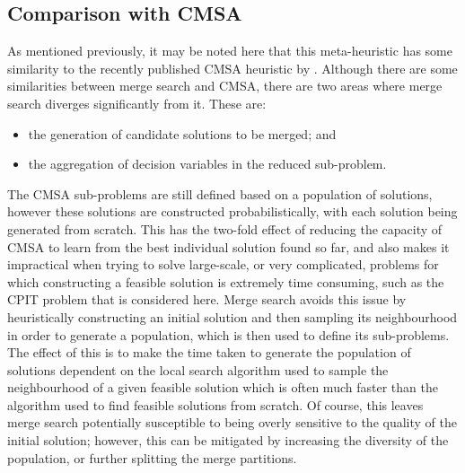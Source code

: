 \documentclass[preprint]{elsarticle}
\begin{document}
\subsection{Comparison with CMSA}
As mentioned previously, it may be noted here that this meta-heuristic has some similarity to the recently published CMSA heuristic by \citet{cmsa}. Although there are some similarities between merge search and CMSA, there are two areas where merge search diverges significantly from it. These are:
\begin{itemize}
\item the generation of candidate solutions to be merged; and
\item the aggregation of decision variables in the reduced sub-problem.
\end{itemize}
The CMSA sub-problems are still defined based on a population of solutions, however these solutions are constructed probabilistically, with each solution being generated from scratch. This has the two-fold effect of reducing the capacity of CMSA to learn from the best individual solution found so far, and also makes it impractical when trying to solve large-scale, or very complicated, problems for which constructing a feasible solution is extremely time consuming, such as the CPIT problem that is considered here. Merge search avoids this issue by heuristically constructing an initial solution and then sampling its neighbourhood in order to generate a population, which is then used to define its sub-problems. The effect of this is to make the time taken to generate the population of solutions dependent on the local search algorithm used to sample the neighbourhood of a given feasible solution which is often much faster than the algorithm used to find feasible solutions from scratch. Of course, this leaves merge search potentially susceptible to being overly sensitive to the quality of the initial solution; however, this can be mitigated by increasing the diversity of the population, or further splitting the merge partitions. 
\end{document}
